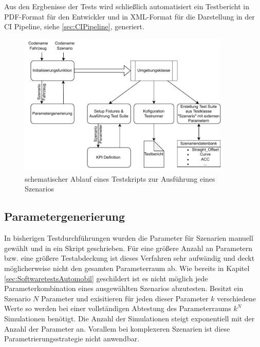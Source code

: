 \noindent Aus den Ergbenisse der Tests wird schließlich automatisiert ein Testbericht in PDF-Format für den Entwickler und in XML-Format für die Darstellung in der CI Pipeline, siehe \ref{sec:CIPipeline}, generiert.

\begin{figure}[ht]
    \centering
    \includegraphics[width=0.9\textwidth]{figures/3_Implementierung/Ablauf_TestSkript.drawio.pdf}
    \caption{schematischer Ablauf eines Testskripts zur Ausführung eines Szenarios}
    \label{fig:Testskript_Ablauf}
\end{figure}

\subsection{Parametergenerierung} \label{subsec:Parametergenerierung}
In bisherigen Testdurchführungen wurden die Parameter für Szenarien manuell gewählt und in ein Skript geschrieben. Für eine größere Anzahl an Parametern bzw. eine größere Testabdeckung ist dieses Verfahren sehr aufwändig und deckt möglicherweise nicht den gesamten Parameterraum ab. Wie bereits in Kapitel \ref{sec:SoftwaretestsAutomobil} geschildert ist es nicht möglich jede Parameterkombination eines ausgewählten Szenarios abzutesten. Besitzt ein Szenario $N$ Parameter und exisitieren für jeden dieser Parameter $k$ verschiedene Werte so werden bei einer vollständigen Abtestung des Parameterraums $k^{N}$ Simulationen benötigt. Die Anzahl der Simulationen steigt exponentiell mit der Anzahl der Parameter an. Vorallem bei komplexeren Szenarien ist diese Parametrierungsstrategie nicht anwendbar.

